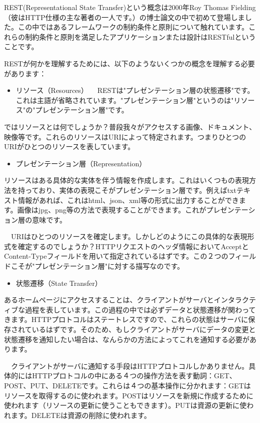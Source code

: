 REST(Representational State Transfer)という概念は2000年Roy Thomas Fielding（彼はHTTP仕様の主な著者の一人です。）の博士論文の中で初めて登場しました。この中ではあるフレームワークの制約条件と原則について触れています。これらの制約条件と原則を満足したアプリケーションまたは設計はRESTfulということです。

RESTが何かを理解するためには、以下のようないくつかの概念を理解する必要があります：

\begin{itemize}
  \item リソース（Resources） 　RESTは"プレゼンテーション層の状態遷移"です。これは主語が省略されています。"プレゼンテーション層"というのは"リソース"の"プレゼンテーション層"です。
\end{itemize}

ではリソースとは何でしょうか？普段我々がアクセスする画像、ドキュメント、映像等です。これらのリソースはURIによって特定されます。つまりひとつのURIがひとつのリソースを表しています。


\begin{itemize}
  \item プレゼンテーション層（Representation）
\end{itemize}

リソースはある具体的な実体を伴う情報を作成します。これはいくつもの表現方法を持っており、実体の表現こそがプレゼンテーション層です。例えばtxtテキスト情報があれば、これはhtml、json、xml等の形式に出力することができます。画像はjpg、png等の方法で表現することができます。これがプレゼンテーション層の意味です。

　URIはひとつのリソースを確定します。しかしどのようにこの具体的な表現形式を確定するのでしょうか？HTTPリクエストのヘッダ情報においてAcceptとContent-Typeフィールドを用いて指定されているはずです。この２つのフィールドこそが"プレゼンテーション層"に対する描写なのです。


\begin{itemize}
  \item 状態遷移（State Transfer）
\end{itemize}

あるホームページにアクセスすることは、クライアントがサーバとインタラクティブな過程を表しています。この過程の中では必ずデータと状態遷移が関わってきます。HTTPプロトコルはステートレスですので、これらの状態はサーバに保存されているはずです。そのため、もしクライアントがサーバにデータの変更と状態遷移を通知したい場合は、なんらかの方法によってこれを通知する必要があります。

　クライアントがサーバに通知する手段はHTTPプロトコルしかありません。具体的にはHTTPプロトコルの中にある４つの操作方法を表す動詞：GET、POST、PUT、DELETEです。これらは４つの基本操作に分かれます：GETはリソースを取得するのに使われます。POSTはリソースを新規に作成するために使われます（リソースの更新に使うこともできます）。PUTは資源の更新に使われます。DELETEは資源の削除に使われます。


